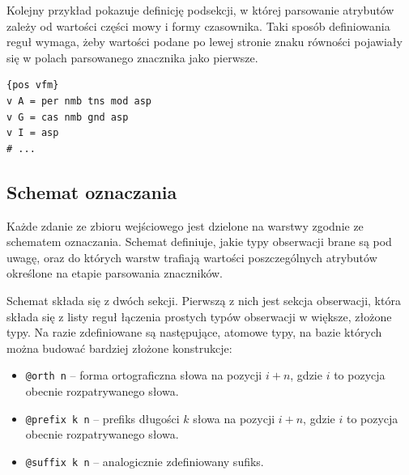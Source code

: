 \documentclass[a4paper,10]{article}
\begin{document}
Kolejny przykład pokazuje definicję podsekcji, w której parsowanie
atrybutów zależy od wartości części mowy i formy czasownika.
Taki sposób definiowania reguł wymaga, żeby wartości podane po
lewej stronie znaku równości pojawiały się w polach
parsowanego znacznika jako pierwsze.
\begin{verbatim}
{pos vfm}
v A	= per nmb tns mod asp
v G	= cas nmb gnd asp
v I	= asp
# ...
\end{verbatim}

\subsection{Schemat oznaczania}\label{sec:schema_def}

Każde zdanie ze zbioru wejściowego jest dzielone na warstwy
zgodnie ze schematem oznaczania. Schemat definiuje, jakie
typy obserwacji brane są pod uwagę, oraz do których
warstw trafiają wartości poszczególnych atrybutów określone na
etapie parsowania znaczników.

Schemat składa się z dwóch sekcji. Pierwszą z nich jest sekcja obserwacji,
która składa się z listy reguł łączenia prostych typów obserwacji
w większe, złożone typy.
Na razie zdefiniowane są następujące, atomowe typy, na bazie których
można budować bardziej złożone konstrukcje:
\begin{itemize}
\item \verb|@orth n| -- forma ortograficzna słowa na pozycji $i + n$,
gdzie $i$ to pozycja obecnie rozpatrywanego słowa.
\item \verb|@prefix k n| -- prefiks długości $k$ słowa na pozycji $i + n$,
gdzie $i$ to pozycja obecnie rozpatrywanego słowa.
\item \verb|@suffix k n| -- analogicznie zdefiniowany sufiks.
\end{itemize}
\end{document}
